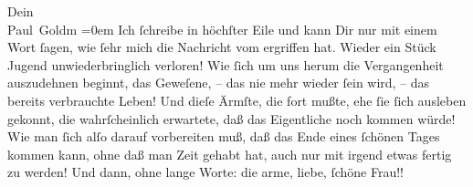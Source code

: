 \pstart
           Dein {\\[\baselineskip]}\spacefill\mbox{Paul Goldm}\pend
           \leftskip=0em{}
\pstart
           \noindent{}Ich ſchreibe in höchſter Eile und kann Dir nur mit einem {\pb}Wort ſagen, wie ſehr mich die Nachricht vom
                     \label{K_L02831-5v}\label{K_L02831-5} ergriffen hat. Wieder ein Stück Jugend unwiederbringlich verloren!
                  Wie ſich um uns  herum die Vergangenheit
                  auszudehnen beginnt, das Geweſene, – das nie mehr wieder ſein wird, – das bereits
                  verbrauchte Leben! Und dieſe Ärmſte, die fort mußte, ehe ſie ſich ausleben gekonnt, die wahrſcheinlich
                  erwartete, daß das Eigentliche noch kommen würde! Wie man ſich alſo darauf
                  vorbereiten muß, daß das Ende eines {\pb}ſchönen
                  Tages kommen kann, ohne daß man Zeit gehabt hat, auch nur mit irgend etwas fertig
                  zu werden! Und dann, ohne lange Worte: die arme, liebe, ſchöne Frau!!\pend
           \endnumbering{}  
      